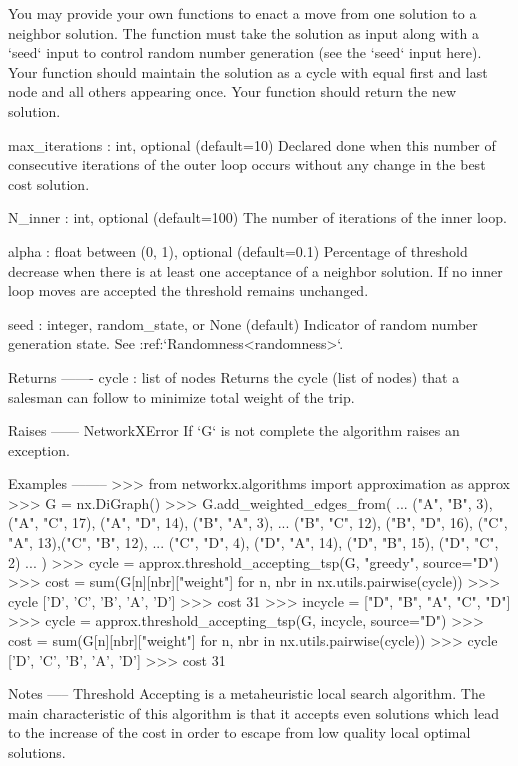 \begin{DoxyVerb}
    You may provide your own functions to enact a move from
    one solution to a neighbor solution. The function must take
    the solution as input along with a `seed` input to control
    random number generation (see the `seed` input here).
    Your function should maintain the solution as a cycle with
    equal first and last node and all others appearing once.
    Your function should return the new solution.

max_iterations : int, optional (default=10)
    Declared done when this number of consecutive iterations of
    the outer loop occurs without any change in the best cost solution.

N_inner : int, optional (default=100)
    The number of iterations of the inner loop.

alpha : float between (0, 1), optional (default=0.1)
    Percentage of threshold decrease when there is at
    least one acceptance of a neighbor solution.
    If no inner loop moves are accepted the threshold remains unchanged.

seed : integer, random_state, or None (default)
    Indicator of random number generation state.
    See :ref:`Randomness<randomness>`.

Returns
-------
cycle : list of nodes
    Returns the cycle (list of nodes) that a salesman
    can follow to minimize total weight of the trip.

Raises
------
NetworkXError
    If `G` is not complete the algorithm raises an exception.

Examples
--------
>>> from networkx.algorithms import approximation as approx
>>> G = nx.DiGraph()
>>> G.add_weighted_edges_from({
...     ("A", "B", 3), ("A", "C", 17), ("A", "D", 14), ("B", "A", 3),
...     ("B", "C", 12), ("B", "D", 16), ("C", "A", 13),("C", "B", 12),
...     ("C", "D", 4), ("D", "A", 14), ("D", "B", 15), ("D", "C", 2)
... })
>>> cycle = approx.threshold_accepting_tsp(G, "greedy", source="D")
>>> cost = sum(G[n][nbr]["weight"] for n, nbr in nx.utils.pairwise(cycle))
>>> cycle
['D', 'C', 'B', 'A', 'D']
>>> cost
31
>>> incycle = ["D", "B", "A", "C", "D"]
>>> cycle = approx.threshold_accepting_tsp(G, incycle, source="D")
>>> cost = sum(G[n][nbr]["weight"] for n, nbr in nx.utils.pairwise(cycle))
>>> cycle
['D', 'C', 'B', 'A', 'D']
>>> cost
31

Notes
-----
Threshold Accepting is a metaheuristic local search algorithm.
The main characteristic of this algorithm is that it accepts
even solutions which lead to the increase of the cost in order
to escape from low quality local optimal solutions.


\end{DoxyVerb}
